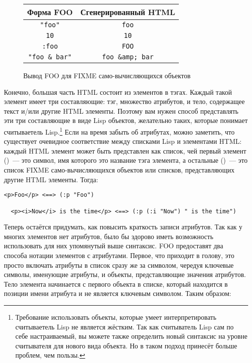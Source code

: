 \begin{figure}[tb]
\begin{tabular}{|c|c|}
\hline
  Форма FOO & Сгенерированный HTML \\
\hline
  \lstinline!"foo"! &\lstinline!foo! \\
  \lstinline!10! & \lstinline!10! \\
  \lstinline!:foo! & \lstinline!FOO! \\
  \lstinline!"foo & bar"! & \lstinline!foo &amp; bar!\\
\hline
\end{tabular}
  \caption{Вывод FOO для FIXME само-вычисляющихся объектов} 
  \label{table:30-1}
\end{figure}

Конечно, большая часть HTML состоит из элементов в тэгах. Каждый такой элемент имеет три
составляющие: тэг, множество атрибутов, и тело, содержащее текст и/или другие HTML
элементы. Поэтому вам нужен способ представлять эти три составляющие в виде Lisp объектов,
желательно таких, которые понимает считываетель Lisp.\footnote{Требование использовать
  объекты, которые умеет интерпретировать считываетель Lisp не является жёстким. Так как
  считыватель Lisp сам по себе настраиваемый, вы можете также определить новый синтаксис
  на уровне считывателя для нового вида объекта. Но в таком подход принесёт больше
  проблем, чем пользы.} Если на время забыть об атрибутах, можно заметить, что существует
очевидное соответствие между списками Lisp и элементами HTML: каждый HTML элемент может
быть представлен как список, чей первый элемент ()~--- это символ, имя которого
это название тэга элемента, а остальные ()~--- это список FIXME
само-вычисляющихся объектов или списков, представляющих другие HTML элементы. Тогда:

\begin{lstlisting}[style=lisprepl]
  <p>Foo</p> <==> (:p "Foo")

  <p><i>Now</i> is the time</p> <==> (:p (:i "Now") " is the time")
\end{lstlisting}

Теперь остаётся придумать, как повысить краткость записи атрибутов. Так как у многих
элементов нет атрибутов, было бы здорово иметь возможность использовать для них упомянутый
выше синтаксис. FOO предоставят два способа нотации элементов с атрибутами. Первое, что
приходит в голову, это просто включать атрибуты в список сразу же за символом, чередуя
ключевые символы, именующие атрибуты, и объекты, представляющие значения атрибутов. Тело
элемента начинается с первого объекта в списке, который находится в позиции имени атрибута
и не является ключевым символом. Таким образом:

